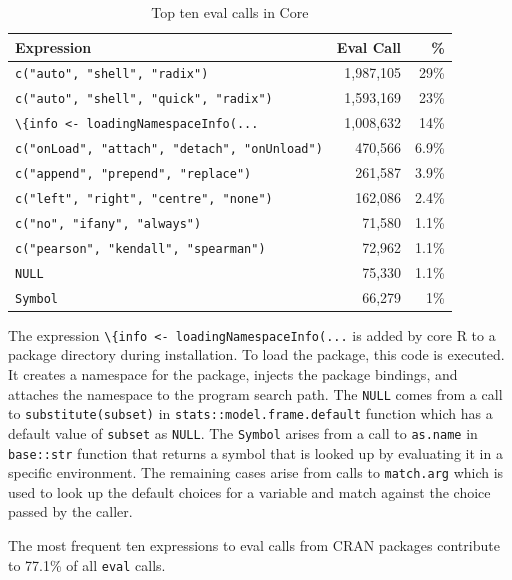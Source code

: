 \documentclass[USenglish,cleveref, autoref, thm-restate]{lipics-v2019}
\newcommand{\eval}{\texttt{eval}\xspace}
\renewcommand{\c}[1]{\lstinline{#1}\xspace}
\begin{document}
\begin{table}[!h] \centering
\begin{tabular}{@{}l|rr@{}} \hline
Expression & Eval Call &  \% \\\hline
\c{c("auto", "shell", "radix")} & 1,987,105 & 29\%\\
\c{c("auto", "shell", "quick", "radix")} & 1,593,169  & 23\%\\
\c{\{info <- loadingNamespaceInfo(...} & 1,008,632 &       14\%\\
\c{c("onLoad", "attach", "detach", "onUnload")}   & 470,566 &      6.9\%\\
\c{c("append", "prepend", "replace")} &              261,587&       3.9\% \\
\c{c("left", "right", "centre", "none")} & 162,086     & 2.4\%\\
\c{c("no", "ifany", "always")}   &                71,580 &       1.1\%\\
\c{c("pearson", "kendall", "spearman")}  & 72,962 &      1.1\%\\
\c{NULL}& 75,330  &      1.1\% \\
\c{Symbol}&                 66,279&       1\%\\\hline
\end{tabular}
\caption{Top ten eval calls in Core}\label{B}
\end{table}

The expression \c{\{info <- loadingNamespaceInfo(...} is added by core R
to a package directory during installation. To load the package, this code is
executed. It creates a namespace for the package, injects the package bindings,
and attaches the namespace to the program search path. The \c{NULL} comes from a
call to \c{substitute(subset)} in \c{stats::model.frame.default} function which
has a default value of \c{subset} as \c{NULL}. The \c{Symbol} arises from a
call to \c{as.name} in \c{base::str} function that returns a symbol that is
looked up by evaluating it in a specific environment. The remaining cases arise
from calls to \c{match.arg} which is used to look up the default choices for a
variable and match against the choice passed by the caller.

The most frequent ten expressions to eval calls from CRAN packages
contribute to 77.1\% of all \eval calls.
\end{document}
